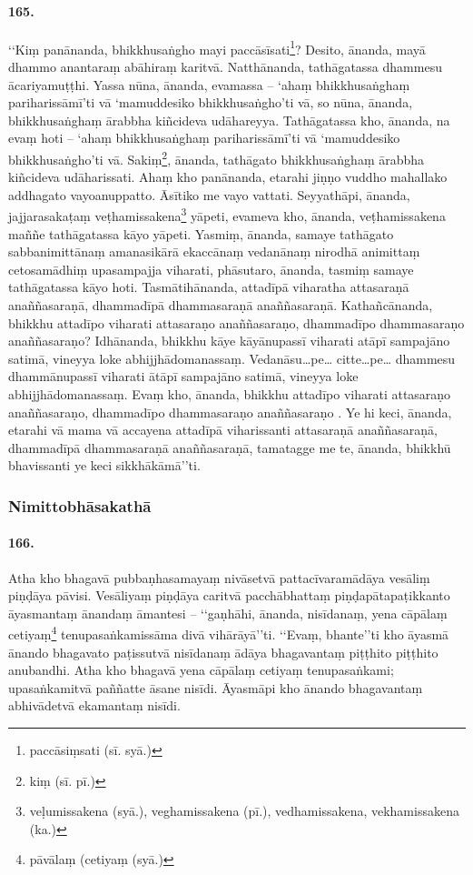 \paragraph{165.} ‘‘Kiṃ panānanda, bhikkhusaṅgho mayi paccāsīsati\footnote{paccāsiṃsati (sī. syā.)}? Desito, ānanda, mayā dhammo anantaraṃ abāhiraṃ karitvā. Natthānanda, tathāgatassa dhammesu ācariyamuṭṭhi. Yassa nūna, ānanda, evamassa – ‘ahaṃ bhikkhusaṅghaṃ pariharissāmī’ti vā ‘mamuddesiko bhikkhusaṅgho’ti vā, so nūna, ānanda, bhikkhusaṅghaṃ ārabbha kiñcideva udāhareyya. Tathāgatassa kho, ānanda, na evaṃ hoti – ‘ahaṃ bhikkhusaṅghaṃ pariharissāmī’ti vā ‘mamuddesiko bhikkhusaṅgho’ti vā. Sakiṃ\footnote{kiṃ (sī. pī.)}, ānanda, tathāgato bhikkhusaṅghaṃ ārabbha kiñcideva udāharissati. Ahaṃ kho panānanda, etarahi jiṇṇo vuddho mahallako addhagato vayoanuppatto. Āsītiko me vayo vattati. Seyyathāpi, ānanda, jajjarasakaṭaṃ veṭhamissakena\footnote{veḷumissakena (syā.), veghamissakena (pī.), vedhamissakena, vekhamissakena (ka.)} yāpeti, evameva kho, ānanda, veṭhamissakena maññe tathāgatassa kāyo yāpeti. Yasmiṃ, ānanda, samaye tathāgato sabbanimittānaṃ amanasikārā ekaccānaṃ vedanānaṃ nirodhā animittaṃ cetosamādhiṃ upasampajja viharati, phāsutaro, ānanda, tasmiṃ samaye tathāgatassa kāyo hoti. Tasmātihānanda, attadīpā viharatha attasaraṇā anaññasaraṇā, dhammadīpā dhammasaraṇā anaññasaraṇā. Kathañcānanda, bhikkhu attadīpo viharati attasaraṇo anaññasaraṇo, dhammadīpo dhammasaraṇo anaññasaraṇo? Idhānanda, bhikkhu kāye kāyānupassī viharati atāpī sampajāno satimā, vineyya loke abhijjhādomanassaṃ. Vedanāsu…pe… citte…pe… dhammesu dhammānupassī viharati ātāpī sampajāno satimā, vineyya loke abhijjhādomanassaṃ. Evaṃ kho, ānanda, bhikkhu attadīpo viharati attasaraṇo anaññasaraṇo, dhammadīpo dhammasaraṇo anaññasaraṇo . Ye hi keci, ānanda, etarahi vā mama vā accayena attadīpā viharissanti attasaraṇā anaññasaraṇā, dhammadīpā dhammasaraṇā anaññasaraṇā, tamatagge me te, ānanda, bhikkhū bhavissanti ye keci sikkhākāmā’’ti.


\subsubsection{Nimittobhāsakathā}

\paragraph{166.} Atha kho bhagavā pubbaṇhasamayaṃ nivāsetvā pattacīvaramādāya vesāliṃ piṇḍāya pāvisi. Vesāliyaṃ piṇḍāya caritvā pacchābhattaṃ piṇḍapātapaṭikkanto āyasmantaṃ ānandaṃ āmantesi – ‘‘gaṇhāhi, ānanda, nisīdanaṃ, yena cāpālaṃ cetiyaṃ\footnote{pāvālaṃ (cetiyaṃ (syā.)} tenupasaṅkamissāma divā vihārāyā’’ti. ‘‘Evaṃ, bhante’’ti kho āyasmā ānando bhagavato paṭissutvā nisīdanaṃ ādāya bhagavantaṃ piṭṭhito piṭṭhito anubandhi. Atha kho bhagavā yena cāpālaṃ cetiyaṃ tenupasaṅkami; upasaṅkamitvā paññatte āsane nisīdi. Āyasmāpi kho ānando bhagavantaṃ abhivādetvā ekamantaṃ nisīdi.

